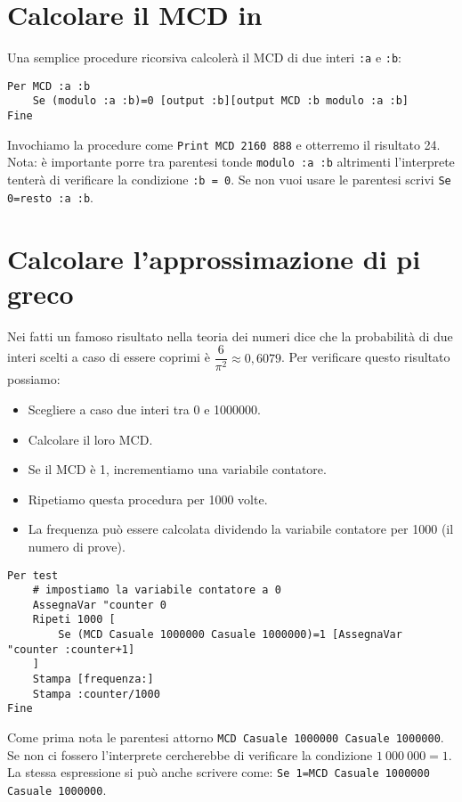 \section{Calcolare il MCD in \logo}
Una semplice procedure ricorsiva calcolerà il MCD di due interi \texttt{:a} e \texttt{:b}:
\begin{lstlisting}
Per MCD :a :b
	Se (modulo :a :b)=0 [output :b][output MCD :b modulo :a :b] 
Fine
\end{lstlisting}

Invochiamo la procedure come \texttt{Print MCD 2160 888} e otterremo il risultato 24.\\
Nota: è importante porre tra parentesi tonde \texttt{modulo :a :b} altrimenti l'interprete tenterà di verificare la condizione \texttt{:b = 0}. Se non vuoi usare le parentesi scrivi \texttt{Se 0=resto :a :b}.



\section{Calcolare l'approssimazione di pi greco}
Nei fatti un famoso risultato nella teoria dei numeri dice che la probabilità di due interi scelti a caso di essere coprimi è $\dfrac{6}{\pi^2}\approx 0,6079$. Per verificare questo risultato possiamo:
\begin{itemize}
	\item Scegliere a caso due interi tra 0 e 1000000.
	\item Calcolare il loro MCD.
	\item Se il MCD è 1, incrementiamo una variabile contatore.
	\item Ripetiamo questa procedura per 1000 volte.
	\item La frequenza può essere calcolata dividendo la variabile contatore per 1000 (il numero di prove).
\end{itemize}

\begin{lstlisting}
Per test
	# impostiamo la variabile contatore a 0
	AssegnaVar "counter 0
	Ripeti 1000 [ 
		Se (MCD Casuale 1000000 Casuale 1000000)=1 [AssegnaVar "counter :counter+1]
	]
	Stampa [frequenza:] 
	Stampa :counter/1000
Fine
\end{lstlisting}

Come prima nota le parentesi attorno \texttt{MCD Casuale 1000000 Casuale 1000000}. Se non ci fossero l'interprete cercherebbe di verificare la condizione $1\ 000\ 000 = 1$. La stessa espressione si può anche scrivere come: \texttt{Se 1=MCD Casuale 1000000 Casuale 1000000}. \\

